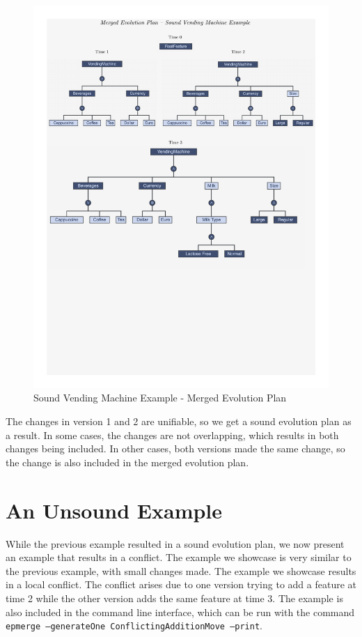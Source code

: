 \documentclass[a4paper,english]{ifimaster}
\begin{document}
\begin{figure}[htpb]
  \centering
  \includegraphics[width=\linewidth]{vending_machine/merged_sound.pdf}
  \caption{Sound Vending Machine Example - Merged Evolution Plan}%
  \label{fig:vending_machine_sound_merged_ep}
\end{figure}

The changes in version 1 and 2 are unifiable, so we get a sound evolution plan as a result. In some cases, the changes are not overlapping, which results in both changes being included. In other cases, both versions made the same change, so the change is also included in the merged evolution plan.

\section{An Unsound Example}%
\label{sec:an_unsound_example}

While the previous example resulted in a sound evolution plan, we now present an example that results in a conflict. The example we showcase is very similar to the previous example, with small changes made. The example we showcase results in a local conflict. The conflict arises due to one version trying to add a feature at time 2 while the other version adds the same feature at time 3. The example is also included in the command line interface, which can be run with the command \texttt{epmerge --generateOne ConflictingAdditionMove --print}.
\end{document}
